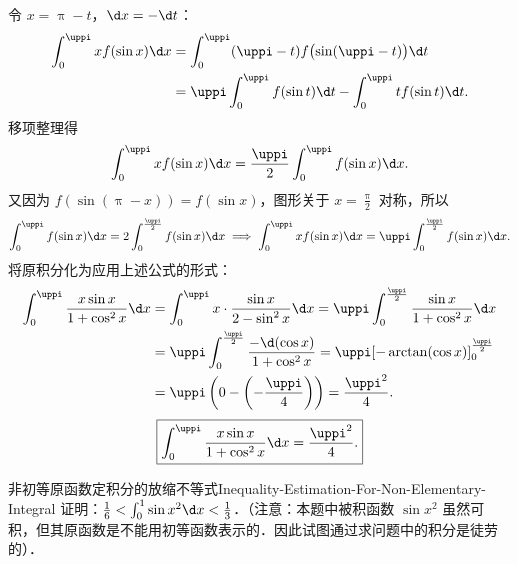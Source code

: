 \begin{solution}
    令 $x = \uppi - t$，$\d x = -\d t$：
    \begin{equation}
        \begin{aligned}
            \int_0^{\uppi} x f(\sin x) \d x & = \int_0^{\uppi} (\uppi - t) f\bigl(\sin(\uppi - t)\bigr) \d t           \\
                                            & = \uppi \int_0^{\uppi} f(\sin t) \d t - \int_0^{\uppi} t f(\sin t) \d t.
        \end{aligned}
    \end{equation}
    移项整理得
    \begin{equation}
        \int_0^{\uppi} x f(\sin x) \d x = \frac{\uppi}{2} \int_0^{\uppi} f(\sin x) \d x.
    \end{equation}
    又因为 $f(\sin(\uppi - x)) = f(\sin x)$，图形关于 $x = \frac{\uppi}{2}$ 对称，所以
    \begin{equation}
        \int_0^{\uppi} f(\sin x) \d x = 2\int_0^{\frac{\uppi}{2}} f(\sin x) \d x \implies \int_0^{\uppi} x f(\sin x) \d x = \uppi \int_0^{\frac{\uppi}{2}} f(\sin x) \d x.
    \end{equation}
    将原积分化为应用上述公式的形式：
    \begin{equation}
        \begin{aligned}
            \int_0^{\uppi} \frac{x\sin x}{1 + \cos^2 x} \d x & = \int_0^{\uppi} x \cdot \frac{\sin x}{2 - \sin^2 x} \d x = \uppi \int_0^{\frac{\uppi}{2}} \frac{\sin x}{1 + \cos^2 x} \d x \\
                                                             & = \uppi \int_0^{\frac{\uppi}{2}} \frac{-\d(\cos x)}{1 + \cos^2 x} = \uppi [-\arctan(\cos x)]_0^{\frac{\uppi}{2}}            \\
                                                             & = \uppi \left( 0 - \left(-\frac{\uppi}{4}\right) \right) = \frac{\uppi^2}{4}.
        \end{aligned}
    \end{equation}
    \begin{equation}
        \boxed{\int_0^{\uppi} \frac{x\sin x}{1 + \cos^2 x} \d x = \frac{\uppi^2}{4}.}
    \end{equation}
\end{solution}

\begin{problem}{非初等原函数定积分的放缩不等式}{Inequality-Estimation-For-Non-Elementary-Integral}
    证明：$\frac{1}{6} < \int_0^1 \sin x^2 \d x < \frac{1}{3}$．（注意：本题中被积函数 $\sin x^2$ 虽然可积，但其原函数是不能用初等函数表示的．因此试图通过求问题中的积分是徒劳的）．
\end{problem}

